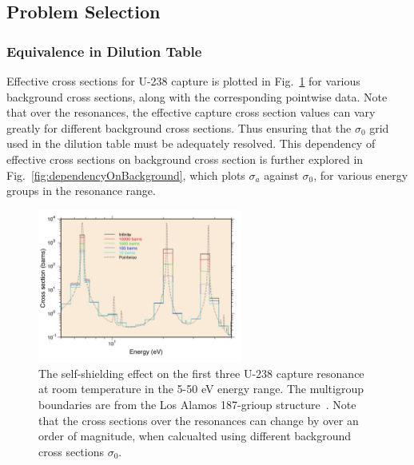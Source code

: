 \documentclass[10pt]{article}
\begin{document}
\subsection{Problem Selection}

\subsubsection{Equivalence in Dilution Table}

Effective cross sections for U-238 capture is plotted in Fig.~\ref{fig:njoyDil} for various background cross sections, along with the corresponding pointwise data. Note that over the resonances, the effective capture cross section values can vary greatly for different background cross sections. Thus ensuring that the $\sigma_0$ grid used in the dilution table must be adequately resolved. This dependency of effective cross sections on background cross section is further explored in Fig.~\ref{fig:dependencyOnBackground}, which plots $\sigma_a$ against $\sigma_0$, for various energy groups in the resonance range. 

\begin{figure}[H]
  \begin{center}
\includegraphics[width=0.6\textwidth]{njoyGroupr}
  \caption{The self-shielding effect on the first three U-238 capture resonance at room temperature in the 5-50 eV energy range. The multigroup boundaries are from the Los Alamos 187-grioup structure~\cite{njoy16}. Note that the cross sections over the resonances can change by over an order of magnitude, when calcualted using different background cross sections $\sigma_0$.}
  \label{fig:njoyDil}
  \end{center}
\end{figure}
\end{document}
